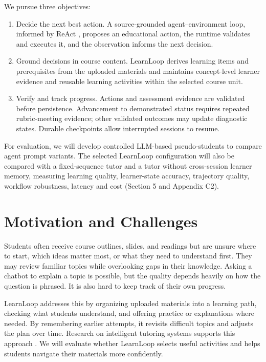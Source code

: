 \documentclass{article}
\begin{document}
We pursue three objectives:
\begingroup
\setlength{\topsep}{2pt}
\setlength{\itemsep}{1pt}
\setlength{\parsep}{0pt}
\begin{enumerate}

\item Decide the next best action. A source-grounded agent--environment loop, informed by ReAct \citep{ref1}, proposes an educational action, the runtime validates and executes it, and the observation informs the next decision.

\item Ground decisions in course content. LearnLoop derives learning items and prerequisites from the uploaded materials and maintains concept-level learner evidence and reusable learning activities within the selected course unit.

\item Verify and track progress. Actions and assessment evidence are validated before persistence. Advancement to demonstrated status requires repeated rubric-meeting evidence; other validated outcomes may update diagnostic states. Durable checkpoints allow interrupted sessions to resume.

\end{enumerate}
\endgroup

For evaluation, we will develop controlled LLM-based pseudo-students to compare agent prompt variants. The selected LearnLoop configuration will also be compared with a fixed-sequence tutor and a tutor without cross-session learner memory, measuring learning quality, learner-state accuracy, trajectory quality, workflow robustness, latency and cost (Section 5 and Appendix C2).

\section{Motivation and Challenges}

Students often receive course outlines, slides, and readings but are unsure where to start, which ideas matter most, or what they need to understand first. They may review familiar topics while overlooking gaps in their knowledge. Asking a chatbot to explain a topic is possible, but the quality depends heavily on how the question is phrased. It is also hard to keep track of their own progress.

LearnLoop addresses this by organizing uploaded materials into a learning path, checking what students understand, and offering practice or explanations where needed. By remembering earlier attempts, it revisits difficult topics and adjusts the plan over time. Research on intelligent tutoring systems supports this approach \citep{ref2}. We will evaluate whether LearnLoop selects useful activities and helps students navigate their materials more confidently.
\end{document}

